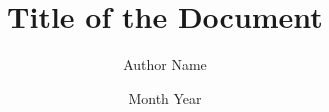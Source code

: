 \documentclass[phd,thesis,twoside]{iist}
\title{Title of the Document}
\author{Author Name}
\date{Month Year}
\begin{document}
\maketitle %
\makecertificate %
\makedeclaration %
\makededication %
\makeacknowledgements %
\makeabstract %
\maketableofcontents %
\makelistoffigures %
\makelistoftables %
\makelistofalgorithms %
\makeabbreviations %
\makenomenclature %
\makechaptersettings %







\makebibsettings



\makepublications

\makeappendixsettings



\makeindexsettings
\end{document}
